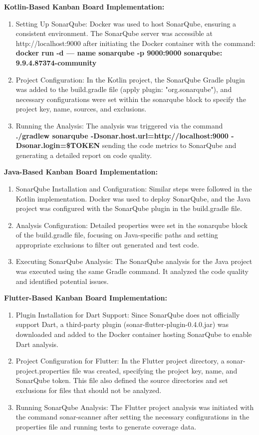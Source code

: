 \textbf{Kotlin-Based Kanban Board Implementation:}
\begin{enumerate}
    \item Setting Up SonarQube: Docker was used to host SonarQube, ensuring a consistent environment. The SonarQube server was accessible at http://localhost:9000 after initiating the Docker container with the command: \textbf{docker run -d — name sonarqube -p 9000:9000 sonarqube: 9.9.4.87374-community}
    \item Project Configuration: In the Kotlin project, the SonarQube Gradle plugin was added to the build.gradle file (apply plugin: "org.sonarqube"), and necessary configurations were set within the sonarqube block to specify the project key, name, sources, and exclusions.
    \item Running the Analysis: The analysis was triggered via the command \textbf{./gradlew sonarqube -Dsonar.host.url=http://localhost:9000 -Dsonar.login=\$TOKEN} sending the code metrics to SonarQube and generating a detailed report on code quality.
\end{enumerate}

\textbf{Java-Based Kanban Board Implementation:}
\begin{enumerate}
    \item SonarQube Installation and Configuration: Similar steps were followed in the Kotlin implementation. Docker was used to deploy SonarQube, and the Java project was configured with the SonarQube plugin in the build.gradle file.
    \item Analysis Configuration: Detailed properties were set in the sonarqube block of the build.gradle file, focusing on Java-specific paths and setting appropriate exclusions to filter out generated and test code.
    \item Executing SonarQube Analysis: The SonarQube analysis for the Java project was executed using the same Gradle command. It analyzed the code quality and identified potential issues.
\end{enumerate}
\textbf{Flutter-Based Kanban Board Implementation:}
\begin{enumerate}
    \item Plugin Installation for Dart Support: Since SonarQube does not officially support Dart, a third-party plugin (sonar-flutter-plugin-0.4.0.jar) was downloaded and added to the Docker container hosting SonarQube to enable Dart analysis.
    \item Project Configuration for Flutter: In the Flutter project directory, a sonar-project.properties file was created, specifying the project key, name, and SonarQube token. This file also defined the source directories and set exclusions for files that should not be analyzed.
    \item Running SonarQube Analysis: The Flutter project analysis was initiated with the command sonar-scanner after setting the necessary configurations in the properties file and running tests to generate coverage data.
\end{enumerate}

